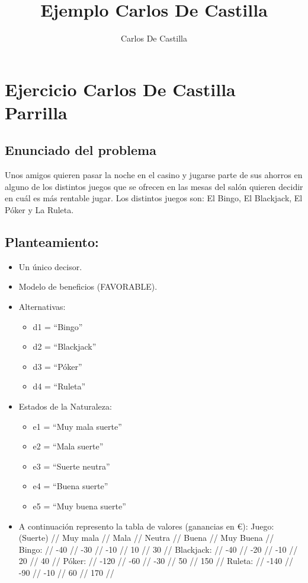 \documentclass[
]{article}
\title{Ejemplo Carlos De Castilla}
\author{Carlos De Castilla}
\date{}
\providecommand{\tightlist}{%
  \setlength{\itemsep}{0pt}\setlength{\parskip}{0pt}}
\begin{document}
\maketitle

\hypertarget{ejercicio-carlos-de-castilla-parrilla}{%
\section{Ejercicio Carlos De Castilla
Parrilla}\label{ejercicio-carlos-de-castilla-parrilla}}

\hypertarget{enunciado-del-problema}{%
\subsection{Enunciado del problema}\label{enunciado-del-problema}}

Unos amigos quieren pasar la noche en el casino y jugarse parte de sus
ahorros en alguno de los distintos juegos que se ofrecen en las mesas
del salón quieren decidir en cuál es más rentable jugar. Los distintos
juegos son: El Bingo, El Blackjack, El Póker y La Ruleta.

\hypertarget{planteamiento}{%
\subsection{Planteamiento:}\label{planteamiento}}

\begin{itemize}
\item
  Un único decisor.
\item
  Modelo de beneficios (FAVORABLE).
\item
  Alternativas:

  \begin{itemize}
  \tightlist
  \item
    d1 = ``Bingo''
  \item
    d2 = ``Blackjack''
  \item
    d3 = ``Póker''
  \item
    d4 = ``Ruleta''
  \end{itemize}
\item
  Estados de la Naturaleza:

  \begin{itemize}
  \tightlist
  \item
    e1 = ``Muy mala suerte''
  \item
    e2 = ``Mala suerte''
  \item
    e3 = ``Suerte neutra''
  \item
    e4 = ``Buena suerte''
  \item
    e5 = ``Muy buena suerte''
  \end{itemize}
\item
  A continuación represento la tabla de valores (ganancias en €): Juego:
  (Suerte) // Muy mala // Mala // Neutra // Buena // Muy Buena //\\
  Bingo: // -40 // -30 // -10 // 10 // 30 // Blackjack: // -40 // -20 //
  -10 // 20 // 40 // Póker: // -120 // -60 // -30 // 50 // 150 //
  Ruleta: // -140 // -90 // -10 // 60 // 170 //
\end{itemize}
\end{document}
